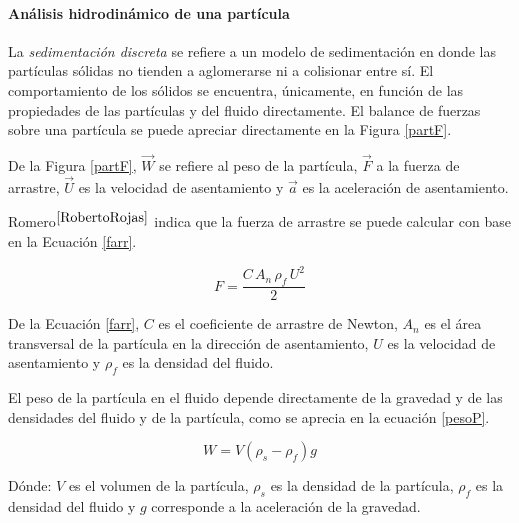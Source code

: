 \paragraph{An\'alisis hidrodin\'amico de una part\'icula}

\noindent
\justify

La \textit{sedimentaci\'on discreta} se refiere a un modelo de sedimentaci\'on en donde las part\'iculas s\'olidas no tienden a aglomerarse ni a colisionar entre s\'i. El comportamiento de los s\'olidos se encuentra, \'unicamente, en funci\'on de las propiedades de las part\'iculas y del fluido directamente. El balance de fuerzas sobre una part\'icula se puede apreciar directamente en la Figura \ref{partF}.



\noindent
\justify


De la Figura \ref{partF}, $\vec{W}$ se refiere al peso de la part\'icula, $\vec{F}$ a la fuerza de arrastre, $\vec{U}$ es la velocidad de asentamiento y $\vec{a}$ es la aceleraci\'on de asentamiento.

\noindent
\justify

Romero$^{\cite{RobertoRojas}}$ indica que la fuerza de arrastre se puede calcular con base en la Ecuaci\'on \ref{farr}.

\begin{equation}
	F = \frac{C \, A_n \, \rho _f \, U^2}{2}
	\label{farr}
\end{equation}

\noindent
\justify

De la Ecuaci\'on \ref{farr}, $C$ es el coeficiente de arrastre de Newton, $A_n$ es el \'area transversal de la part\'icula en la direcci\'on de asentamiento, $U$ es la velocidad de asentamiento y $\rho _f$ es la densidad del fluido.

\noindent
\justify

El peso de la part\'icula en el fluido depende directamente de la gravedad y de las densidades del fluido y de la part\'icula, como se aprecia en la ecuaci\'on \ref{pesoP}.

\begin{equation}
	W = V \left(\rho _s - \rho _f \right) g
	\label{pesoP}
\end{equation}

\noindent
\justify

D\'onde: $V$ es el volumen de la part\'icula, $\rho _s$ es la densidad de la part\'icula, $\rho _f$ es la densidad del fluido y $g$ corresponde a la aceleraci\'on de la gravedad.

